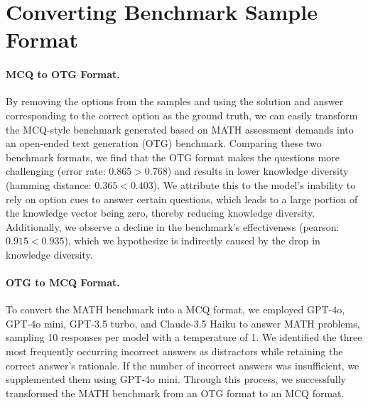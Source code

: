 \section{Converting Benchmark Sample Format}
\paragraph{MCQ to OTG Format.}
\label{sec:convert}
By removing the options from the samples and using the solution and answer corresponding to the correct option as the ground truth, we can easily transform the MCQ-style benchmark generated based on MATH assessment demands into an open-ended text generation (OTG) benchmark. Comparing these two benchmark formats, we find that the OTG format makes the questions more challenging (error rate: $0.865 > 0.768$) and results in lower knowledge diversity (hamming distance: $0.365 < 0.403$). We attribute this to the model's inability to rely on option cues to answer certain questions, which leads to a large portion of the knowledge vector being zero, thereby reducing knowledge diversity. Additionally, we observe a decline in the benchmark’s effectiveness (pearson: $0.915 < 0.935$), which we hypothesize is indirectly caused by the drop in knowledge diversity.

\paragraph{OTG to MCQ Format.}
\label{sec:MATH_convert}
To convert the MATH benchmark into a MCQ format, we employed GPT-4o, GPT-4o mini, GPT-3.5 turbo, and Claude-3.5 Haiku to answer MATH problems, sampling 10 responses per model with a temperature of 1. We identified the three most frequently occurring incorrect answers as distractors while retaining the correct answer's rationale. If the number of incorrect answers was insufficient, we supplemented them using GPT-4o mini. Through this process, we successfully transformed the MATH benchmark from an OTG format to an MCQ format.


